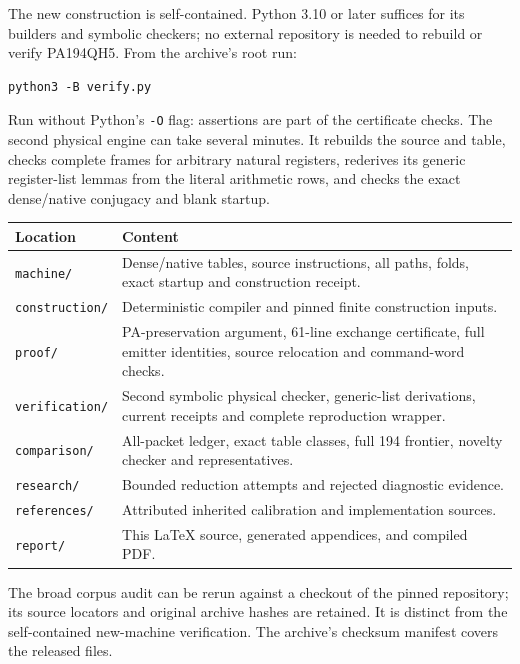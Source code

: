 \documentclass[11pt,letterpaper]{article}
\newcommand{\file}[1]{\texttt{\nolinkurl{#1}}}
\begin{document}
The new construction is self-contained. Python 3.10 or later suffices for
its builders and symbolic checkers; no external repository is needed to
rebuild or verify PA194QH5. From the archive's root run:
\begin{verbatim}
python3 -B verify.py
\end{verbatim}
Run without Python's \file{-O} flag: assertions are part of the certificate
checks. The second physical engine can take several minutes. It rebuilds
the source and table, checks complete frames for arbitrary natural registers,
rederives its generic register-list lemmas from the literal arithmetic rows,
and checks the exact dense/native conjugacy and blank startup.

\begin{center}\small
\begin{tabularx}{\textwidth}{@{}lX@{}}\toprule
Location & Content\\\midrule
\file{machine/} & Dense/native tables, source instructions, all paths, folds,
 exact startup and construction receipt.\\
\file{construction/} & Deterministic compiler and pinned finite construction inputs.\\
\file{proof/} & PA-preservation argument, 61-line exchange certificate,
 full emitter identities, source relocation and command-word checks.\\
\file{verification/} & Second symbolic physical checker, generic-list derivations,
 current receipts and complete reproduction wrapper.\\
\file{comparison/} & All-packet ledger, exact table classes, full 194 frontier,
 novelty checker and representatives.\\
\file{research/} & Bounded reduction attempts and rejected diagnostic evidence.\\
\file{references/} & Attributed inherited calibration and implementation sources.\\
\file{report/} & This LaTeX source, generated appendices, and compiled PDF.\\\bottomrule
\end{tabularx}
\end{center}

The broad corpus audit can be rerun against a checkout of the pinned
repository; its source locators and original archive hashes are retained.
It is distinct from the self-contained new-machine verification. The
archive's checksum manifest covers the released files.
\end{document}
